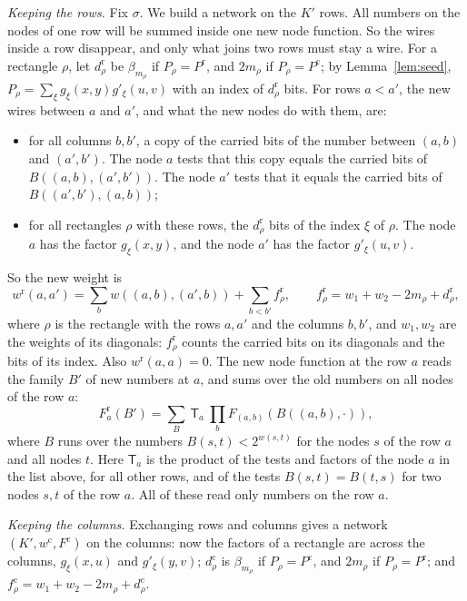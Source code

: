 \documentclass[11pt]{article}
\begin{document}
\emph{Keeping the rows.} Fix $\sigma$. We build a network on the $K'$ rows. All numbers on the nodes of one row will be summed inside one new node function. So the wires inside a row disappear, and only what joins two rows must stay a wire. For a rectangle $\rho$, let $d^{\mathrm r}_\rho$ be $\beta_{m_\rho}$ if $P_\rho=P^{\mathrm r}$, and $2m_\rho$ if $P_\rho=P^{\mathrm c}$; by Lemma~\ref{lem:seed}, $P_\rho=\sum_\xi g_\xi(x,y)g'_\xi(u,v)$ with an index of $d^{\mathrm r}_\rho$ bits. For rows $a<a'$, the new wires between $a$ and $a'$, and what the new nodes do with them, are:
\begin{itemize}\setlength{\itemsep}{0pt}
\item for all columns $b,b'$, a copy of the carried bits of the number between $(a,b)$ and $(a',b')$. The node $a$ tests that this copy equals the carried bits of $B((a,b),(a',b'))$. The node $a'$ tests that it equals the carried bits of $B((a',b'),(a,b))$;
\item for all rectangles $\rho$ with these rows, the $d^{\mathrm r}_\rho$ bits of the index $\xi$ of $\rho$. The node $a$ has the factor $g_\xi(x,y)$, and the node $a'$ has the factor $g'_\xi(u,v)$.
\end{itemize}
So the new weight is
\begin{equation}\label{wrow}
w^{\mathrm r}(a,a')=\sum_bw((a,b),(a',b))+\sum_{b<b'}f^{\mathrm r}_\rho,\qquad f^{\mathrm r}_\rho=w_1+w_2-2m_\rho+d^{\mathrm r}_\rho,
\end{equation}
where $\rho$ is the rectangle with the rows $a,a'$ and the columns $b,b'$, and $w_1,w_2$ are the weights of its diagonals: $f^{\mathrm r}_\rho$ counts the carried bits on its diagonals and the bits of its index. Also $w^{\mathrm r}(a,a)=0$. The new node function at the row $a$ reads the family $B'$ of new numbers at $a$, and sums over the old numbers on all nodes of the row $a$:
\begin{equation}\label{newF}
F^{\mathrm r}_a(B')=\sum_{B}\ \mathsf T_a\ \prod_{b}F_{(a,b)}(B((a,b),\cdot)),
\end{equation}
where $B$ runs over the numbers $B(s,t)<2^{w(s,t)}$ for the nodes $s$ of the row $a$ and all nodes $t$. Here $\mathsf T_a$ is the product of the tests and factors of the node $a$ in the list above, for all other rows, and of the tests $B(s,t)=B(t,s)$ for two nodes $s,t$ of the row $a$. All of these read only numbers on the row $a$.

\emph{Keeping the columns.} Exchanging rows and columns gives a network $(K',w^{\mathrm c},F^{\mathrm c})$ on the columns: now the factors of a rectangle are across the columns, $g_\xi(x,u)$ and $g'_\xi(y,v)$; $d^{\mathrm c}_\rho$ is $\beta_{m_\rho}$ if $P_\rho=P^{\mathrm c}$, and $2m_\rho$ if $P_\rho=P^{\mathrm r}$; and $f^{\mathrm c}_\rho=w_1+w_2-2m_\rho+d^{\mathrm c}_\rho$.
\end{document}
